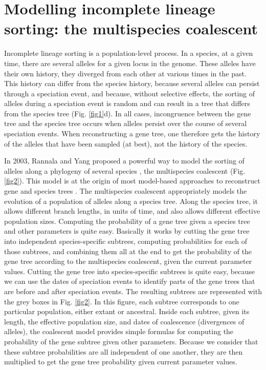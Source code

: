 \section{Modelling incomplete lineage sorting: the multispecies coalescent}
Incomplete lineage sorting is a population-level process.
In a species, at a given time, there are several alleles for a given locus in the genome.
These alleles have their own history, they diverged from each other at various times in the past.
This history can differ from the species history, because several alleles can persist through a speciation event, and because, without selective effects, the sorting of alleles during a speciation event is random and can result in a tree that differs from the species tree (Fig. \ref{fig1}d).
In all cases, incongruence between the gene tree and the species tree occurs when alleles persist over the course of several speciation events.
When reconstructing a gene tree, one therefore gets the history of the alleles that have been sampled (at best), not the history of the species. 

In 2003, Rannala and Yang proposed a powerful way to model the sorting of alleles along a phylogeny of several species \citep{Rannala2003a}, the multispecies coalescent (Fig. \ref{fig2}).
This model is at the origin of most model-based approaches to reconstruct gene and species trees \citep{Edwards2007,Heled2010}.
The multispecies coalescent appropriately models the evolution of a population of alleles along a species tree.
Along the species tree, it allows different branch lengths, in units of time, and also allows different effective population sizes.
Computing the probability of a gene tree given a species tree and other parameters is quite easy.
Basically it works by cutting the gene tree into independent species-specific subtrees, computing probabilities for each of those subtrees, and combining them all at the end to get the probability of the gene tree according to the multispecies coalescent, given the current parameter values.
Cutting the gene tree into species-specific subtrees is quite easy, because we can use the dates of speciation events to identify parts of the gene trees that are before and after speciation events. 
The resulting subtrees are represented with the grey boxes in Fig. \ref{fig2}.
In this figure, each subtree corresponds to one particular population, either extant or ancestral.
Inside each subtree, given its length, the effective population size, and dates of coalescence (divergences of alleles), the coalescent model provides simple formulas for computing the probability of the gene subtree given other parameters.
Because we consider that these subtree probabilities are all independent of one another, they are then multiplied to get the gene tree probability given current parameter values.
 
